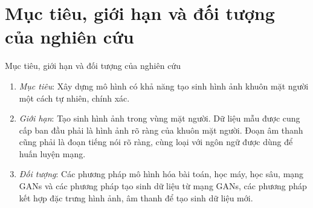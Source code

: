 \section{Mục tiêu, giới hạn và đối tượng của nghiên cứu}\label{sec:intro}
\frame{\tableofcontents[currentsection]}
\begin{frame}{Mục tiêu, giới hạn và đối tượng của nghiên cứu}
\begin{enumerate}
    \item \textit{Mục tiêu}: Xây dựng mô hình có khả năng tạo sinh hình ảnh khuôn mặt người một cách tự nhiên, chính xác.
    \item \textit{Giới hạn}: Tạo sinh hình ảnh trong vùng mặt người. Dữ liệu mẫu được cung cấp ban đầu phải là hình ảnh rõ ràng của khuôn mặt người. Đoạn âm thanh cũng phải là đoạn tiếng nói rõ ràng, cùng loại với ngôn ngữ được dùng để huấn luyện mạng.
    \item \textit{Đối tượng}: Các phương pháp mô hình hóa bài toán, học máy, học sâu, mạng GANs và các phương pháp tạo sinh dữ liệu từ mạng GANs, các phương pháp kết hợp đặc trưng hình ảnh, âm thanh để tạo sinh dữ liệu mới.
\end{enumerate}
\end{frame}
